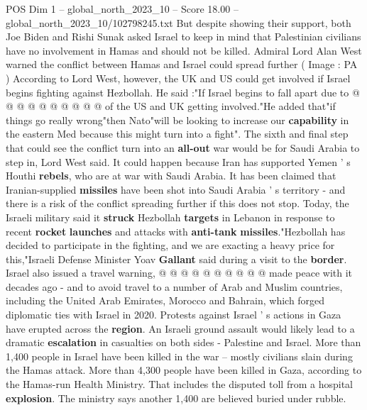 \begin{textsample}{POS Dim 1 – global\_north\_2023\_10 – Score 18.00 – global\_north\_2023\_10/102798245.txt}
But despite showing their support, both Joe Biden and Rishi Sunak asked Israel to keep in mind that Palestinian civilians have no involvement in Hamas and should not be killed.
Admiral Lord Alan West warned the conflict between Hamas and Israel could spread further ( Image : PA ) According to Lord West, however, the UK and US could get involved if Israel begins fighting against Hezbollah.
He said :"If Israel begins to fall apart due to @ @ @ @ @ @ @ @ @ @ of the US and UK getting involved."He added that"if things go really wrong"then Nato"will be looking to increase our \textbf{capability} in the eastern Med because this might turn into a fight".
The sixth and final step that could see the conflict turn into an \textbf{all-out} war would be for Saudi Arabia to step in, Lord West said.
It could happen because Iran has supported Yemen ' s Houthi \textbf{rebels}, who are at war with Saudi Arabia.
It has been claimed that Iranian-supplied \textbf{missiles} have been shot into Saudi Arabia ' s territory - and there is a risk of the conflict spreading further if this does not stop.
Today, the Israeli military said it \textbf{struck} Hezbollah \textbf{targets} in Lebanon in response to recent \textbf{rocket} \textbf{launches} and attacks with \textbf{anti-tank} \textbf{missiles}."Hezbollah has decided to participate in the fighting, and we are exacting a heavy price for this,"Israeli Defense Minister Yoav \textbf{Gallant} said during a visit to the \textbf{border}.
Israel also issued a travel warning, @ @ @ @ @ @ @ @ @ @ made peace with it decades ago - and to avoid travel to a number of Arab and Muslim countries, including the United Arab Emirates, Morocco and Bahrain, which forged diplomatic ties with Israel in 2020.
Protests against Israel ' s actions in Gaza have erupted across the \textbf{region}.
An Israeli ground assault would likely lead to a dramatic \textbf{escalation} in casualties on both sides - Palestine and Israel.
More than 1,400 people in Israel have been killed in the war -- mostly civilians slain during the Hamas attack.
More than 4,300 people have been killed in Gaza, according to the Hamas-run Health Ministry.
That includes the disputed toll from a hospital \textbf{explosion}.
The ministry says another 1,400 are believed buried under rubble.

\end{textsample}
